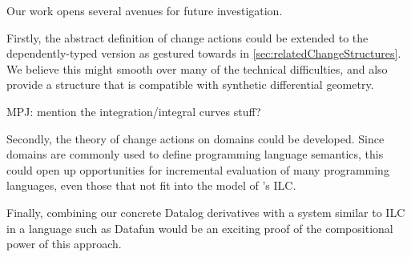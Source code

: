 Our work opens several avenues for future investigation.

Firstly, the abstract definition of change actions could be extended to the
dependently-typed version as gestured towards in
\cref{sec:relatedChangeStructures}. We believe this might smooth over many of
the technical difficulties, and also provide a structure that is compatible with
synthetic differential geometry.

MPJ: mention the integration/integral curves stuff?

Secondly, the theory of change actions on domains could be developed. Since
domains are commonly used to define programming language semantics, this could
open up opportunities for incremental evaluation of many programming languages,
even those that not fit into the model of \citeauthor{cai2014changes}'s ILC.

Finally, combining our concrete Datalog derivatives with a system similar to ILC
in a language such as Datafun would be an exciting proof of the compositional
power of this approach.

\printbibliography


